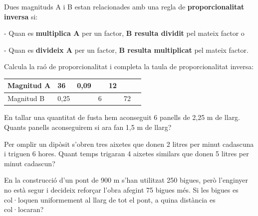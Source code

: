 \begin{theorybox}
  Dues magnituds A i B estan relacionades amb una regla de
  \textbf{proporcionalitat inversa} si:

  - Quan es \textbf{multiplica A} per un factor, \textbf{B resulta
  dividit} pel mateix factor o

  - Quan es \textbf{divideix A} per un factor, \textbf{B resulta
  multiplicat} pel mateix factor.
\end{theorybox}

\begin{mylist}
\exer \spen
 Calcula la raó de
  proporcionalitat i completa la taula de proporcionalitat inversa:

\begin{center}
\begin{tabular}[]{@{}p{2.5cm}|p{1cm}|p{1cm}|p{1cm}|p{1cm}|p{1cm}|p{1cm}@{}}
\toprule
Magnitud A & 36 & 0,09 & & 12 &\tabularnewline
\midrule
Magnitud B & 0,25 & & 6 & & 72\tabularnewline
\bottomrule
\end{tabular}
\end{center}



\exer
  En tallar una quantitat de fusta hem aconseguit 6 panells de 2,25 m de
  llarg. Quants panells aconseguirem si ara fan 1,5 m de llarg?
  
  
  
\exer
  Per omplir un dipòsit s'obren tres aixetes que donen 2 litres per
  minut cadascuna i triguen 6 hores. Quant temps trigaran 4 aixetes
  similars que donen 5 litres per minut cadascun?

\exer
  En la construcció d'un pont de 900 m s'han utilitzat 250 bigues, però
  l'enginyer no està  segur i decideix reforçar l'obra afegint 75
  bigues més. Si les bigues es col·loquen uniformement al llarg de tot
  el pont, a quina distància es col·locaran?

\end{mylist}


